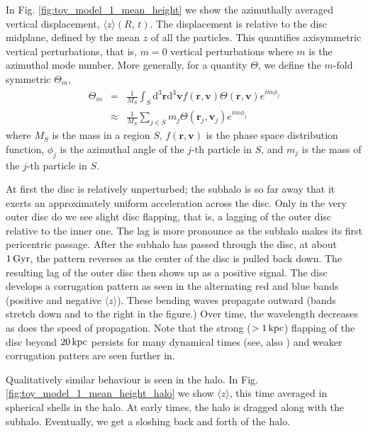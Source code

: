 In Fig. \ref{fig:toy_model_1_mean_height} we show the azimuthally
averaged vertical displacement, $\langle z\rangle(R,\,t)$. The displacement
is relative to the disc midplane, defined by the mean $z$ of all the
particles. {
This quantifies axisymmetric vertical perturbations, that is, $m=0$
vertical perturbations where $m$ is the azimuthal mode number.  More generally, for a quantity $\Theta$, we define the $m$-fold symmetric $\Theta_m$,}
\begin{eqnarray}
\Theta_{m} &=&\frac{1}{M_S} \int_S \text{d}^3 \textbf{r} \text{d}^3\textbf{v} f(\textbf{r}, \textbf{v}) \Theta(\textbf{r} , \textbf{v})e^{i m \phi_j}\\
&\approx& \frac{1}{M_S} \sum_{j \in S} m_j \Theta(\textbf{r}_j, \textbf{v}_j)e^{im \phi_j} \label{eq:z_statistic}
\end{eqnarray}
{where $M_S$ is the mass in a region $S$, $f(\textbf{r},\textbf{v})$ is the phase space distribution function, $\phi_j$ is the azimuthal angle of the $j$-th particle in $S$, and $m_j$ is the mass of the $j$-th particle in $S$. 
}

At first the disc is relatively unperturbed; the subhalo is
so far away that it exerts an approximately uniform acceleration
across the disc. Only in the very outer disc do we see slight disc
flapping, that is, a lagging of the outer disc relative to the inner
one. The lag is more pronounce as the subhalo makes its first
pericentric passage. After the subhalo has passed through the disc, at
about $1\,{\rm Gyr}$, the pattern reverses as the center of the disc
is pulled back down. The resulting lag of the outer disc then shows up
as a positive signal. The disc develops a corrugation pattern as seen
in the alternating red and blue bands (positive and negative $\langle
z\rangle$). These bending waves propagate outward (bands stretch down
and to the right in the figure.) Over time, the wavelength decreases
as does the speed of propagation. Note that the strong ($> 1\,{\rm
  kpc}$) flapping of the disc beyond $20\,{\rm kpc}$ persists for many
dynamical times (see, also \citet{sellwood_1996}) and weaker
corrugation patters are seen further in.

Qualitatively similar behaviour is seen in the halo. In
Fig. \ref{fig:toy_model_1_mean_height_halo} we show $\langle
z\rangle$, this time averaged in spherical shells in the halo. At
early times, the halo is dragged along with the subhalo. Eventually,
we get a sloshing back and forth of the halo.

